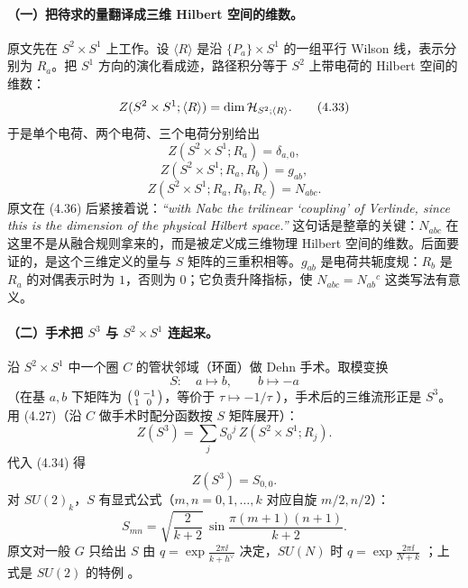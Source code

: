 \paragraph{（一）把待求的量翻译成三维 Hilbert 空间的维数。}
原文先在 $S^2\times S^1$ 上工作。设 $\langle R\rangle$ 是沿 $\{P_a\}\times S^1$ 的一组平行 Wilson 线，表示分别为 $R_a$。把 $S^1$ 方向的演化看成迹，路径积分等于 $S^2$ 上带电荷的 Hilbert 空间的维数：
\begin{equation}
Z(S^2\times S^1;\langle R\rangle)=\dim\mathcal{H}_{S^2;\langle R\rangle}. \tag{4.33}
\end{equation}
于是单个电荷、两个电荷、三个电荷分别给出
\begin{equation}
Z(S^2\times S^1;R_a)=\delta_{a,0}, \tag{4.34}
\end{equation}
\begin{equation}
Z(S^2\times S^1;R_a,R_b)=g_{ab}, \tag{4.35}
\end{equation}
\begin{equation}
Z(S^2\times S^1;R_a,R_b,R_c)=N_{abc}. \tag{4.36}
\end{equation}
原文在 (4.36) 后紧接着说：\emph{“with Nabc the trilinear `coupling' of Verlinde, since this is the dimension of the physical Hilbert space.”}  这句话是整章的关键：$N_{abc}$ 在这里不是从融合规则拿来的，而是被\emph{定义}成三维物理 Hilbert 空间的维数。后面要证的，是这个三维定义的量与 $S$ 矩阵的三重积相等。$g_{ab}$ 是电荷共轭度规：$R_b$ 是 $R_a$ 的对偶表示时为 $1$，否则为 $0$；它负责升降指标，使 $N_{abc}=N_{ab}{}^{c}$ 这类写法有意义。

\paragraph{（二）手术把 $S^3$ 与 $S^2\times S^1$ 连起来。}
沿 $S^2\times S^1$ 中一个圈 $C$ 的管状邻域（环面）做 Dehn 手术。取模变换
\begin{equation}
S:\quad a\mapsto b,\qquad b\mapsto -a
\end{equation}
（在基 $a,b$ 下矩阵为 $\begin{psmallmatrix}0&-1\\1&0\end{psmallmatrix}$，等价于 $\tau\mapsto-1/\tau$ ），手术后的三维流形正是 $S^3$。用 (4.27)（沿 $C$ 做手术时配分函数按 $S$ 矩阵展开）：
\begin{equation}
Z(S^3)=\sum_j S_0{}^j\,Z(S^2\times S^1;R_j). \tag{4.37}
\end{equation}
代入 (4.34) 得
\begin{equation}
Z(S^3)=S_{0,0}. \tag{4.38}
\end{equation}
对 $SU(2)_k$，$S$ 有显式公式（$m,n=0,1,\dots,k$ 对应自旋 $m/2,n/2$）：
\begin{equation}
S_{mn}=\sqrt{\frac{2}{k+2}}\,\sin\frac{\pi(m+1)(n+1)}{k+2}.
\label{eq:smatrix}
\end{equation}
原文对一般 $G$ 只给出 $S$ 由 $q=\exp\frac{2\pi\ii}{k+h^\vee}$ 决定，$SU(N)$ 时 $q=\exp\frac{2\pi\ii}{N+k}$ ；上式是 $SU(2)$ 的特例 。

